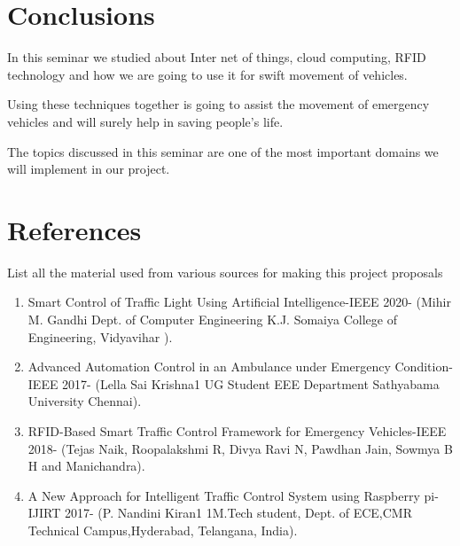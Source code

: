 \documentclass[12pt,a4paper]{report}
\begin{document}
\section{\textbf{Conclusions}}
In this seminar we studied about Inter net of things, cloud computing, RFID technology and how we are going to use it for swift movement of vehicles.\par
Using these techniques together is going to assist the movement of emergency vehicles and will surely help in saving people's life.\par
 The topics discussed in this seminar are one of the most important domains we will implement in our project.  \par


\newpage

\section{\textbf{References}}

List all the material used from various sources for making this project proposals

\begin{enumerate}
\item Smart Control of Traffic Light Using Artificial Intelligence-IEEE 2020- (Mihir M. Gandhi Dept. of Computer Engineering K.J. Somaiya College of Engineering, Vidyavihar ).

\item Advanced Automation Control in an Ambulance under Emergency Condition-IEEE 2017- (Lella Sai Krishna1 UG Student EEE Department Sathyabama University Chennai).

\item RFID-Based Smart Traffic Control Framework for Emergency Vehicles-IEEE 2018- (Tejas Naik, Roopalakshmi R, Divya Ravi N, Pawdhan Jain, Sowmya B H and Manichandra).

\item A New Approach for Intelligent Traffic Control System using Raspberry pi-IJIRT 2017- (P. Nandini Kiran1 1M.Tech student, Dept. of ECE,CMR Technical Campus,Hyderabad, Telangana, India).


\end{enumerate}
\end{document}
